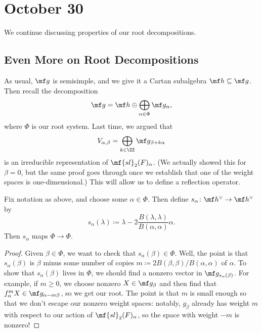 \documentclass[../notes.tex]{subfiles}
\begin{document}
\section{October 30}
We continue discussing properties of our root decompositions.

\subsection{Even More on Root Decompositions}
As usual, $\mf g$ is semisimple, and we give it a Cartan subalgebra $\mf h\subseteq\mf g$. Then recall the decomposition
\[\mf g=\mf h\oplus\bigoplus_{\alpha\in\Phi}\mf g_{\alpha},\]
where $\Phi$ is our root system. Last time, we argued that
\[V_{\alpha,\beta}=\bigoplus_{k\in\ZZ}\mf g_{\beta+k\alpha}\]
is an irreducible representation of $\mf{sl}_2(F)_\alpha$. (We actually showed this for $\beta=0$, but the same proof goes through once we establish that one of the weight spaces is one-dimensional.) This will allow us to define a reflection operator.
\begin{lemma} \label{lem:reflect-root-system}
	Fix notation as above, and choose some $\alpha\in\Phi$. Then define $s_\alpha\colon\mf h^\lor\to\mf h^\lor$ by
	\[s_\alpha(\lambda)\coloneqq\lambda-2\frac{B(\lambda,\lambda)}{B(\alpha,\alpha)}\alpha.\]
	Then $s_\alpha$ maps $\Phi\to\Phi$.
\end{lemma}
\begin{proof}
	Given $\beta\in\Phi$, we want to check that $s_\alpha(\beta)\in\Phi$. Well, the point is that $s_\alpha(\beta)$ is $\beta$ minus some number of copies $m\coloneqq2B(\beta,\beta)/B(\alpha,\alpha)$ of $\alpha$. To show that $s_\alpha(\beta)$ lives in $\Phi$, we should find a nonzero vector in $\mf g_{s_\alpha(\beta)}$. For example, if $m\ge0$, we choose nonzero $X\in\mf g_\beta$ and then find that $f_\alpha^mX\in\mf g_{\alpha-m\beta}$, so we get our root. The point is that $m$ is small enough so that we don't escape our nonzero weight spaces: notably, $g_\beta$ already has weight $m$ with respect to our action of $\mf{sl}_2(F)_\alpha$, so the space with weight $-m$ is nonzero!
\end{proof}
\end{document}
